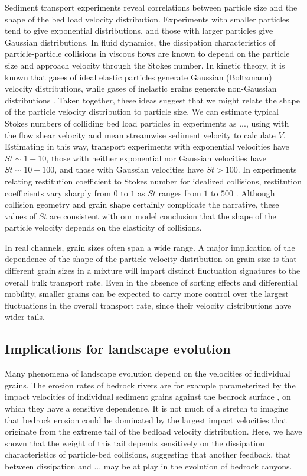 Sediment transport experiments reveal correlations between particle size and the shape of the bed load velocity distribution.
Experiments with smaller particles tend to give exponential distributions, and those with larger particles give Gaussian distributions.
In fluid dynamics, the dissipation characteristics of particle-particle collisions in viscous flows are known to depend on the particle size and approach velocity through the Stokes number. 
In kinetic theory, it is known that gases of ideal elastic particles generate Gaussian (Boltzmann) velocity distributions, while gases of inelastic grains generate non-Gaussian distributions \citep{Chapman1970,Brilliantov2004}.
Taken together, these ideas suggest that we might relate the shape of the particle velocity distribution to particle size.
We can estimate typical Stokes numbers of colliding bed load particles in experiments as $...$, using with the flow shear velocity and mean streamwise sediment velocity to calculate $V$. Estimating in this way, transport experiments with exponential velocities have $St \sim 1-10$, those with neither exponential nor Gaussian velocities have $St \sim 10-100$, and those with Gaussian velocities have $St > 100$.
In experiments relating restitution coefficient to Stokes number for idealized collisions, restitution coefficients vary sharply from $0$ to $1$ as $St$ ranges from $1$ to $500$ \cite{Marshall2011,Joseph2001,Yang2006}.
Although collision geometry and grain shape certainly complicate the narrative, these values of $St$ are consistent with our model conclusion that the shape of the particle velocity depends on the elasticity of collisions.

In real channels, grain sizes often span a wide range. A major implication of the dependence of the shape of the particle velocity distribution on grain size is that different grain sizes in a mixture will impart distinct fluctuation signatures to the overall bulk transport rate. Even in the absence of sorting effects and differential mobility, smaller grains can be expected to carry more control over the largest fluctuations in the overall transport rate, since their velocity distributions have wider tails. 

\subsection{Implications for landscape evolution}

Many phenomena of landscape evolution depend on the velocities of individual grains.
The erosion rates of bedrock rivers are for example parameterized by the impact velocities of individual sediment grains against the bedrock surface \citep{Sklar2004,Li2020,Turowski2021}, on which they have a sensitive dependence.
It is not much of a stretch to imagine that bedrock erosion could be dominated by the largest impact velocities that originate from the extreme tail of the bedload velocity distribution. Here, we have shown that the weight of this tail depends sensitively on the dissipation characteristics of particle-bed collisions, suggesting that another feedback, that between dissipation and ... may be at play in the evolution of bedrock canyons.



